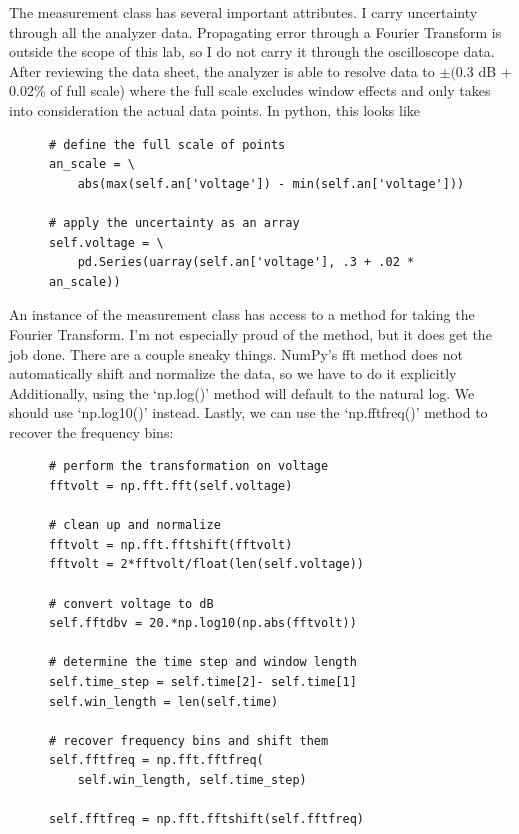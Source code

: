 \documentclass{article}
\begin{document}
The measurement class has several important attributes. I carry uncertainty
through all the analyzer data. Propagating error through a Fourier Transform is
outside the scope of this lab, so I do not carry it through the oscilloscope
data. After reviewing the data sheet, the analyzer is able to resolve data to
$\pm($0.3 dB + 0.02\% of full scale) where the full scale excludes window
effects and only takes into consideration the actual data points. In python,
this looks like

\begin{figure}[H]
\centering
\begin{minipage}{1\textwidth}
\begin{tcolorbox}
\begin{verbatim}
# define the full scale of points
an_scale = \
    abs(max(self.an['voltage']) - min(self.an['voltage']))

# apply the uncertainty as an array
self.voltage = \
    pd.Series(uarray(self.an['voltage'], .3 + .02 * an_scale))
\end{verbatim}
\end{tcolorbox}
\end{minipage}
\end{figure}

An instance of the measurement class has access to a method for taking the
Fourier Transform. I'm not especially proud of the method, but it does get the
job done. There are a couple sneaky things. NumPy's fft method does not
automatically shift and normalize the data, so we have to do it explicitly
Additionally, using the `np.log()' method will default to the natural log. We
should use `np.log10()' instead. Lastly, we can use the `np.fftfreq()' method
to recover the frequency bins:

\begin{figure}[H]
\centering
\begin{minipage}{1\textwidth}
\begin{tcolorbox}
\begin{verbatim}
# perform the transformation on voltage
fftvolt = np.fft.fft(self.voltage)

# clean up and normalize
fftvolt = np.fft.fftshift(fftvolt)
fftvolt = 2*fftvolt/float(len(self.voltage))

# convert voltage to dB
self.fftdbv = 20.*np.log10(np.abs(fftvolt))

# determine the time step and window length
self.time_step = self.time[2]- self.time[1]
self.win_length = len(self.time)

# recover frequency bins and shift them
self.fftfreq = np.fft.fftfreq(
    self.win_length, self.time_step)

self.fftfreq = np.fft.fftshift(self.fftfreq)
\end{verbatim}
\end{tcolorbox}
\end{minipage}
\end{figure}
\end{document}
